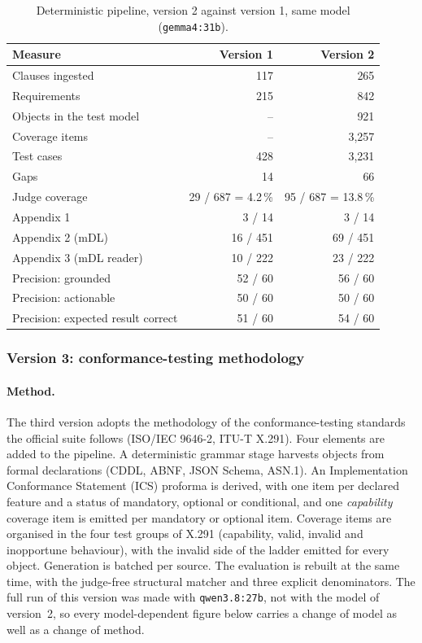 \begin{table}[t]
  \centering
  \caption{Deterministic pipeline, version 2 against version 1, same model
    (\texttt{gemma4:31b}).}
  \label{tab:testmodel}
  \begin{tabular}{lrr}
    \toprule
    Measure & Version 1 & Version 2 \\
    \midrule
    Clauses ingested            & 117 & 265 \\
    Requirements                & 215 & 842 \\
    Objects in the test model   & --  & 921 \\
    Coverage items              & --  & 3,257 \\
    Test cases                  & 428 & 3,231 \\
    Gaps                        & 14  & 66 \\
    \midrule
    Judge coverage              & 29 / 687 = 4.2\,\% & 95 / 687 = 13.8\,\% \\
    \quad Appendix 1            & 3 / 14   & 3 / 14 \\
    \quad Appendix 2 (mDL)      & 16 / 451 & 69 / 451 \\
    \quad Appendix 3 (mDL reader) & 10 / 222 & 23 / 222 \\
    \midrule
    Precision: grounded         & 52 / 60 & 56 / 60 \\
    Precision: actionable       & 50 / 60 & 50 / 60 \\
    Precision: expected result correct & 51 / 60 & 54 / 60 \\
    \bottomrule
  \end{tabular}
\end{table}

\subsubsection{Version 3: conformance-testing methodology}
\label{sec:exp-conformance}

\paragraph{Method.}
The third version adopts the methodology of the conformance-testing
standards the official suite follows (ISO/IEC 9646-2, ITU-T X.291). Four
elements are added to the pipeline. A deterministic grammar stage harvests
objects from formal declarations (CDDL, ABNF, JSON Schema, ASN.1). An
Implementation Conformance Statement (ICS) proforma is derived, with one item
per declared feature and a status of mandatory, optional or conditional, and
one \emph{capability} coverage item is emitted per mandatory or optional
item. Coverage items are organised in the four test groups of X.291
(capability, valid, invalid and inopportune behaviour), with the invalid side
of the ladder emitted for every object. Generation is batched per source. The
evaluation is rebuilt at the same time, with the judge-free structural matcher
and three explicit denominators. The full run of this version was made with
\texttt{qwen3.8:27b}, not with the model of version~2, so every
model-dependent figure below carries a change of model as well as a change of
method.

